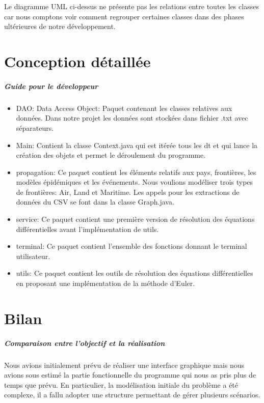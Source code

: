 \documentclass[12pt,a4paper]{report}
\begin{document}
\begin{flushleft}
	Le diagramme UML ci-dessus ne présente pas les relations entre toutes les classes car nous comptons voir comment regrouper certaines classes dans des phases ultérieures de notre développement.
\end{flushleft}


\chapter*{Conception détaillée}
\paragraph{Guide pour le développeur}

\begin{flushleft}
\begin{itemize}
L'aborescence des paquets est la suivante:
\item DAO: Data Access Object: Paquet contenant les classes relatives aux données. Dans notre projet les données sont stockées dans fichier .txt avec séparateurs.
\item Main: Contient la classe Context.java qui est itérée tous les dt et qui lance la création des objets et permet le déroulement du programme.
\item propagation: Ce paquet contient les éléments relatifs aux pays, frontières, les modèles épidémiques et les événements. Nous voulions modéliser trois types de frontières: Air, Land et Maritime. Les appels pour les extractions de données du CSV se font 
dans la classe Graph.java.
\item service: Ce paquet contient une première version de résolution des équations différentielles avant l'implémentation de utils.
\item terminal: Ce paquet contient l'ensemble des fonctions donnant le terminal utilisateur.
\item utils: Ce paquet contient les outils de résolution des équations différentielles en proposant une implémentation de la méthode d'Euler.
\end{itemize}
\end{flushleft}

\chapter*{Bilan}

\paragraph{Comparaison entre l'objectif et la réalisation}
\begin{flushleft}
Nous avions initialement prévu de réaliser une interface graphique mais nous avions sous estimé la partie fonctionnelle du programme qui nous as pris plus de temps que prévu.
En particulier, la modélisation initiale du problème a été complexe, il a fallu adopter une structure permettant de gérer plusieurs scénarios.
\end{flushleft}
\end{document}
